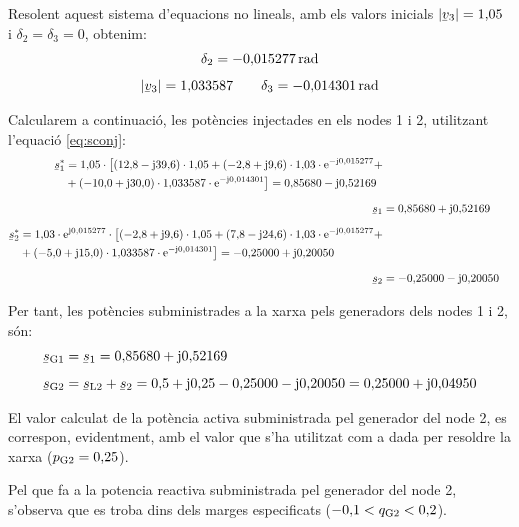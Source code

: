 \begin{exemple}
Resolent aquest sistema d'equacions no lineals, amb els valors
inicials $|\cmplx{v}_3|=1{,}05$ i $\delta_2=\delta_3=0$, obtenim:
\begin{gather*}
   \delta_2=-0{,}015277\unit{rad} \\[1ex]
   |\cmplx{v}_3|=1{,}033587 \qquad \delta_3=-0{,}014301\unit{rad}
\end{gather*}

Calcularem a continuaci\'{o}, les pot\`{e}ncies injectades en els nodes 1 i
2, utilitzant l'equaci\'{o} \eqref{eq:sconj}:
\begin{align*}
\begin{split}
\cmplx{s}_1^* &= 1{,}05 \cdot\bigl[ (12{,}8-\ju39{,}6) \cdot 1{,}05
+
(-2{,}8+\ju9{,}6) \cdot 1{,}03\cdot\eu^{-\ju0{,}015277} + \\
&+ (-10{,}0+\ju30{,}0) \cdot 1{,}033587\cdot\eu^{-\ju0{,}014301}
\bigr] = 0{,}85680 - \ju 0{,}52169
\end{split} \\[1.5ex]
\cmplx{s}_1 &= 0{,}85680 + \ju 0{,}52169 \\[1.5ex]
\begin{split}
\cmplx{s}_2^* &= 1{,}03 \cdot\eu^{\ju0{,}015277} \cdot\bigl[
(-2{,}8+\ju9{,}6) \cdot 1{,}05 +
 (7{,}8-\ju24{,}6) \cdot 1{,}03\cdot\eu^{-\ju0{,}015277} + \\
& + (-5{,}0+\ju15{,}0) \cdot 1{,}033587\cdot\eu^{-\ju0{,}014301}
\bigr] = -0{,}25000 + \ju 0{,}20050
\end{split} \\[1.5ex]
 \cmplx{s}_2 &= -0{,}25000 - \ju 0{,}20050
\end{align*}

Per tant, les pot\`{e}ncies subministrades a la xarxa pels generadors
dels nodes 1 i 2, s\'{o}n:
\begin{align*}
\cmplx{s}\ped{G1} &= \cmplx{s}_1 = 0{,}85680 + \ju 0{,}52169 \\[1ex]
\cmplx{s}\ped{G2} &= \cmplx{s}\ped{L2} + \cmplx{s}_2 = 0{,}5 + \ju
0{,}25 -0{,}25000 - \ju 0{,}20050  = 0{,}25000 + \ju 0{,}04950
\end{align*}

El valor calculat de la pot\`{e}ncia activa subministrada pel generador
del node 2, es
 correspon, evidentment, amb el valor que s'ha utilitzat com a dada per
resoldre la xarxa ($p_\mathrm{G2}=0{,}25$).

Pel que fa a la potencia reactiva subministrada pel generador del
node 2, s'observa que es troba dins dels  marges especificats
($-0{,}1<q_\mathrm{G2}<0{,}2$).
\end{exemple}

